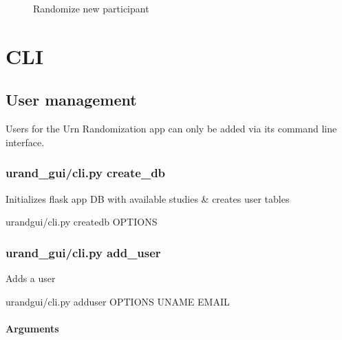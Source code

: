\documentclass[letterpaper,10pt,english]{sphinxmanual}
\begin{document}
\begin{figure}[htbp]
\centering
\capstart

\noindent{}
\caption{Randomize new participant}\label{\detokenize{overview:id3}}\label{\detokenize{overview:fig-randomize-frm}}\end{figure}


\chapter{CLI}
\label{\detokenize{cli:cli}}\label{\detokenize{cli::doc}}

\section{User management}
\label{\detokenize{cli:user-management}}
Users for the Urn Randomization app can only be added via its command line interface.


\subsection{urand\_gui/cli.py create\_db}
\label{\detokenize{cli:urand-gui-cli-py-create-db}}
Initializes flask app DB with available studies \& creates user tables

\begin{sphinxVerbatim}[commandchars=\\\{\}]
urand\PYGZus{}gui/cli.py create\PYGZus{}db \PYG{o}{[}OPTIONS\PYG{o}{]}
\end{sphinxVerbatim}


\subsection{urand\_gui/cli.py add\_user}
\label{\detokenize{cli:urand-gui-cli-py-add-user}}
Adds a user

\begin{sphinxVerbatim}[commandchars=\\\{\}]
urand\PYGZus{}gui/cli.py add\PYGZus{}user \PYG{o}{[}OPTIONS\PYG{o}{]} UNAME EMAIL
\end{sphinxVerbatim}
\subsubsection*{Arguments}
\end{document}
